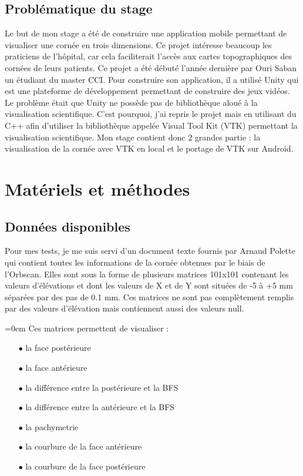 \documentclass[a4paper,12pt]{article}
\begin{document}
\newpage
	\subsection{Problématique du stage}
Le but de mon stage a été de construire une application mobile permettant de visualiser une cornée en trois dimensions. Ce projet intéresse beaucoup les praticiens de l'hôpital, car cela faciliterait l'accès aux cartes topographiques des cornées de leurs patients. Ce projet a été débuté l'année dernière par Ouri Saban un étudiant du master CCI. Pour construire son application, il a utilisé Unity qui est une plateforme de développement permettant de construire des jeux vidéos. Le problème était que Unity ne possède pas de bibliothèque aloué à la visualisation scientifique. C'est pourquoi, j'ai repris le projet mais en utilisant du C++ afin d'utiliser la bibliothèque appelée Visual Tool Kit (VTK) permettant la visualisation scientifique. Mon stage contient donc 2 grandes partie : la visualisation de la cornée avec VTK en local et le portage de VTK sur Android. 


\newpage
\section{Matériels et méthodes}
	\subsection{Données disponibles}
Pour mes tests, je me suis servi d'un document texte fournis par Arnaud Polette qui contient toutes les informations de la cornée obtenues par le biais de l'Orbscan. Elles sont sous la forme de plusieurs matrices 101x101 contenant les valeurs d'élévations et dont les valeurs de X et de Y sont situées de -5 à +5 mm séparées par des pas de 0.1 mm. Ces matrices ne sont pas complètement remplis par des valeurs d'élévation mais contiennent aussi des valeurs null.

\vspace{0.25cm}
\parindent=0em Ces matrices permettent de visualiser : %
\begin{itemize}\setlength{\itemsep}{1mm}
	\item[$\bullet$] la face postérieure 
	\item[$\bullet$] la face antérieure
	\item[$\bullet$] la différence entre la postérieure et la BFS
	\item[$\bullet$] la différence entre la antérieure et la BFS
	\item[$\bullet$] la pachymetrie
	\item[$\bullet$] la courbure de la face antérieure
	\item[$\bullet$] la courbure de la face postérieure
\end{itemize}
\end{document}
